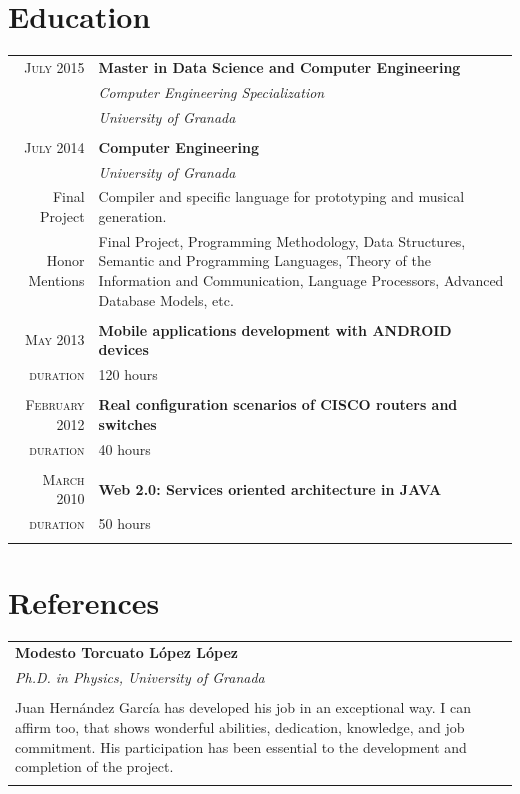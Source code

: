 \documentclass[a4paper,10pt]{article} %
\newcommand{\duration}{\textcolor{linkcolour}{\textsc{duration}}}
\newcommand{\fproject}{\textcolor{linkcolour}{Final Project}}
\newcommand{\hmentions}{\textcolor{linkcolour}{Honor Mentions}}
\begin{document}
\section{Education}

\begin{tabular}{r|p{11cm}}

\textsc{July 2015} & \textbf{Master in Data Science and Computer Engineering} \\
                   & \emph{Computer Engineering
Specialization}\\
& \emph{University of Granada} \\
\multicolumn{2}{c}{} \\

\textsc{July} 2014 & \textbf{Computer Engineering} \\
 & \emph{University of Granada}\\ 
 \fproject & Compiler and specific language for prototyping and musical
generation.\\ 
\hmentions & Final Project, Programming Methodology, Data Structures,
Semantic and Programming Languages, Theory of the Information and Communication, Language
Processors, Advanced Database Models, etc.\\
\multicolumn{2}{c}{} \\

\textsc{May} 2013 & \textbf{Mobile applications development with ANDROID
devices}\\
\duration & 120 hours \\
\multicolumn{2}{c}{} \\

\textsc{February} 2012 & \textbf{Real configuration scenarios of CISCO routers
and switches}\\
\duration & 40 hours \\
\multicolumn{2}{c}{} \\

\textsc{March} 2010 & \textbf{Web 2.0: Services oriented architecture in JAVA}\\
\duration & 50 hours\\
\multicolumn{2}{c}{} \\
\end{tabular}

\section{References}

\begin{tabular}{p{146mm}}

\textbf{Modesto Torcuato López López} \\
\emph{Ph.D. in Physics, University of Granada}\\ \\
Juan Hernández García has developed his job in an exceptional way. I can affirm
too, that shows wonderful abilities, dedication, knowledge, and job commitment.
His participation has been essential to the development and completion of the
project. \\
\multicolumn{1}{c}{}
\end{tabular}
\end{document}
